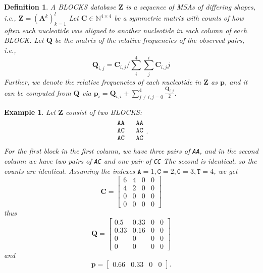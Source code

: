 \documentclass{article}
\newtheorem{definition}{Definition}
\newtheorem{example}{Example}
\begin{document}
\begin{definition}
A BLOCKS database $\mathbf Z$ is a sequence of MSAs of differing shapes, i.e., $\mathbf Z = (\mathbf A^k)_{k=1}^l$
	Let $\mathbf C \in \mathbb N^{4 \times 4}$ be a symmetric matrix
with counts of how often each nucleotide was aligned to another nucleotide in each column of each BLOCK.
Let $\mathbf Q$ be the matrix of the relative frequencies of the observed pairs, i.e.,
\begin{equation*}
	 \mathbf Q_{i, j} = \mathbf C_{i, j} / \sum_i^4 \sum_j^i \mathbf C_{i, j}j
\end{equation*}
Further, we denote the relative frequencies of each nucleotide in $\mathbf Z$ as $\mathbf p$, and it can
be computed from $\mathbf Q$ via $\mathbf p_i = \mathbf Q_{i, i} + \sum_{j \ne i, j = 0}^4 \frac {\mathbf Q_{i, j}} {2}$.
\end{definition}
\begin{example}
	Let $\mathbf Z$ consist of two BLOCKS:
	\begin{equation*}
		\begin{matrix}
		\begin{matrix}
			\texttt{AA} \\
			\texttt{AC} \\
			\texttt{AC} \\
		\end{matrix} &
		\begin{matrix}
			\texttt{AA} \\
			\texttt{AC} \\
			\texttt{AC} \\
		\end{matrix}.
	\end{matrix}
	\end{equation*}
	For the first block in the first column, we have three pairs of \texttt{AA}, and in the second column we have two pairs of \texttt{AC} and one pair of \texttt{CC}
	The second  is identical, so the counts are identical. Assuming the indexes $\mathtt A = 1, \mathtt C = 2, \mathtt G = 3, \mathtt T = 4$, we get
	\begin{equation*}
		\mathbf C = \begin{bmatrix}
			6 & 4 & 0 & 0 \\
			4 & 2 & 0 & 0 \\
			0 & 0 & 0 & 0 \\
			0 & 0 & 0 & 0
		\end{bmatrix}
	\end{equation*}
	thus
	\begin{equation*}
		\mathbf Q = \begin{bmatrix}
			0.5 & 0.33 & 0 & 0 \\
			0.33 & 0.16 & 0 & 0 \\
			0 & 0 & 0 & 0 \\
			0 & 0 & 0 & 0
		\end{bmatrix}
	\end{equation*}
	and
	\begin{equation*}
		\mathbf p = \begin{bmatrix}
			0.66 & 0.33 & 0 & 0
		\end{bmatrix}.
	\end{equation*}
\end{example}
\end{document}
